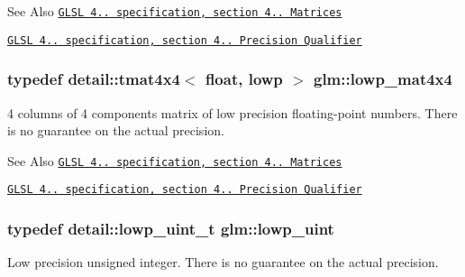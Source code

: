 \begin{DoxySeeAlso}{See Also}
\href{http://www.opengl.org/registry/doc/GLSLangSpec.4.20.8.pdf}{\tt G\-L\-S\-L 4.. specification, section 4.. Matrices} 

\href{http://www.opengl.org/registry/doc/GLSLangSpec.4.20.8.pdf}{\tt G\-L\-S\-L 4.. specification, section 4.. Precision Qualifier} 
\end{DoxySeeAlso}
\hypertarget{group__core__precision_gad31846a0565c22a0479950313c28b218}{
\subsubsection[{lowp\-\_\-mat4x4}]{\setlength{\rightskip}{0pt plus 5cm}typedef detail\-::tmat4x4$<$ float, lowp $>$ {\bf glm\-::lowp\-\_\-mat4x4}}}\label{group__core__precision_gad31846a0565c22a0479950313c28b218}
4 columns of 4 components matrix of low precision floating-\/point numbers. There is no guarantee on the actual precision.

\begin{DoxySeeAlso}{See Also}
\href{http://www.opengl.org/registry/doc/GLSLangSpec.4.20.8.pdf}{\tt G\-L\-S\-L 4.. specification, section 4.. Matrices} 

\href{http://www.opengl.org/registry/doc/GLSLangSpec.4.20.8.pdf}{\tt G\-L\-S\-L 4.. specification, section 4.. Precision Qualifier} 
\end{DoxySeeAlso}
\hypertarget{group__core__precision_ga8077c90f2c87e419ea6c273157dcc1fc}{
\subsubsection[{lowp\-\_\-uint}]{\setlength{\rightskip}{0pt plus 5cm}typedef detail\-::lowp\-\_\-uint\-\_\-t {\bf glm\-::lowp\-\_\-uint}}}\label{group__core__precision_ga8077c90f2c87e419ea6c273157dcc1fc}
Low precision unsigned integer. There is no guarantee on the actual precision.

